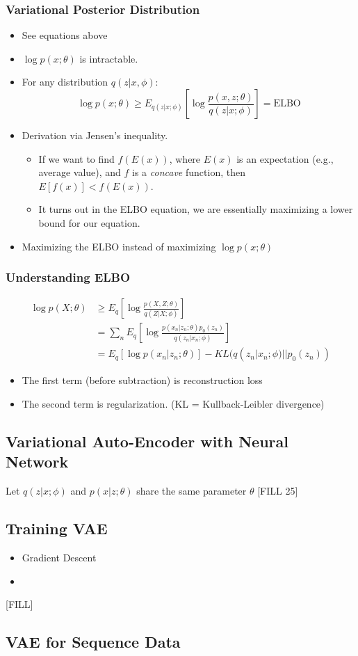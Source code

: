 \documentclass[10pt]{article}
\begin{document}
\subsubsection*{Variational Posterior Distribution}
\begin{itemize}
	\item See equations above
	\item $\log p(x; \theta)$ is intractable.
	\item For any distribution $q(z | x, \phi)$:
	\[\log p(x; \theta) \geq E_{q(z|x; \phi)} \left[\log \frac{p(x, z; \theta)}{q(z|x; \phi)}\right] = \text{ELBO}\]
    \item Derivation via Jensen's inequality.
    \begin{itemize}
	    \item If we want to find $f(E(x))$, where $E(x)$ is an expectation (e.g., average value), and $f$ is a \textit{concave} function, then $E[f(x)] < f(E(x))$.
	    \item It turns out in the ELBO equation, we are essentially maximizing a lower bound for our equation.
    \end{itemize}
    \item Maximizing the ELBO instead of maximizing $\log p(x; \theta)$
\end{itemize}

\subsubsection*{Understanding ELBO}
\begin{align*}
    \log p(X; \theta) &\geq E_q\left[\log \frac{p(X, Z; \theta)}{q(Z | X; \phi)}\right] \\
    &= \sum_n E_q \left[\log \frac{p(x_n | z_n; \theta) p_0(z_n)}{q(z_n | x_n; \phi)}\right] \\
    &= E_q [\log p(x_n | z_n; \theta)] - KL(q(z_n|x_n; \phi) || p_0(z_n))
\end{align*}
\begin{itemize}
	\item The first term (before subtraction) is reconstruction loss
	\item The second term is regularization.  (KL = Kullback-Leibler divergence)
\end{itemize}

\subsection*{Variational Auto-Encoder with Neural Network}
Let $q(z | x; \phi)$ and $p(x | z; \theta)$ share the same parameter $\theta$
[FILL 25]

\subsection*{Training VAE}
\begin{itemize}
	\item Gradient Descent
	\item [FILL]
\end{itemize}

[FILL]

\subsection*{VAE for Sequence Data}
\end{document}
